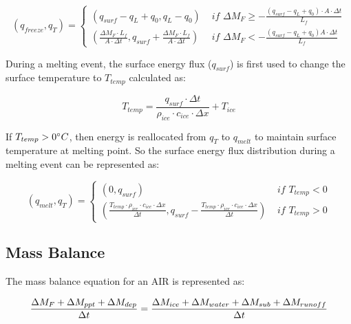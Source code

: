 \documentclass[utf8]{frontiersSCNS} %
\begin{document}
\begin{equation}
	(q_{freeze}, q_{T}) = \left\{ \begin{array}{ll}
		(q_{surf}-q_{L}+q_{0}, q_{L}-q_{0}) & \textit{ if } \Delta M_{F} \geq -\frac{(q_{surf}-q_{L}+q_{0}) \cdot A \cdot \Delta
		t}{L_f}                                                                                                                  \\
		(\frac{\Delta M_{F} \cdot L_f
		}{A \cdot \Delta t}
		, q_{surf}+\frac{\Delta M_{F} \cdot L_f
		}{A \cdot \Delta t})                & \textit{ if } \Delta M_{F} < -\frac{(q_{surf}-q_{L}+q_0) A \cdot \Delta
		t}{L_f}
	\end{array} \right.
\end{equation}

During a melting event, the surface energy flux ($q_{surf}$) is first used to change the surface temperature to
$T_{temp}$ calculated as:

\begin{equation} T_{temp} =\frac{q_{surf} \cdot \Delta t}{\rho_{ice} \cdot c_{ice} \cdot \Delta x} + T_{ice} \end{equation}

If $T_{temp} > 0 \degree C$, then energy is reallocated from $q_{T}$ to $q_{melt}$ to maintain surface temperature at
melting point. So the surface energy flux distribution during a melting event can be represented as:

\begin{equation}
	(q_{melt}, q_{T}) = \left\{ \begin{array}{ll}
		(0, q_{surf})                                                                                                                                                 & \textit{ if } T_{temp} < 0 \\
		(\frac{T_{temp} \cdot \rho_{ice} \cdot c_{ice} \cdot \Delta x}{\Delta t}, q_{surf}-\frac{T_{temp} \cdot \rho_{ice} \cdot c_{ice} \cdot \Delta x}{\Delta t}  ) & \textit{ if } T_{temp} > 0
	\end{array} \right.
\end{equation}


\subsection{Mass Balance}
The mass balance equation for an AIR is represented as:

\begin{equation}
	\frac{\Delta M_{F} + \Delta M_{ppt} + \Delta M_{dep}}{\Delta t} = \frac{\Delta M_{ice} +\Delta M_{water} +
		\Delta M_{sub} + \Delta M_{runoff}}{\Delta t}  \\
	\label{eq:MB}
\end{equation}
\end{document}
